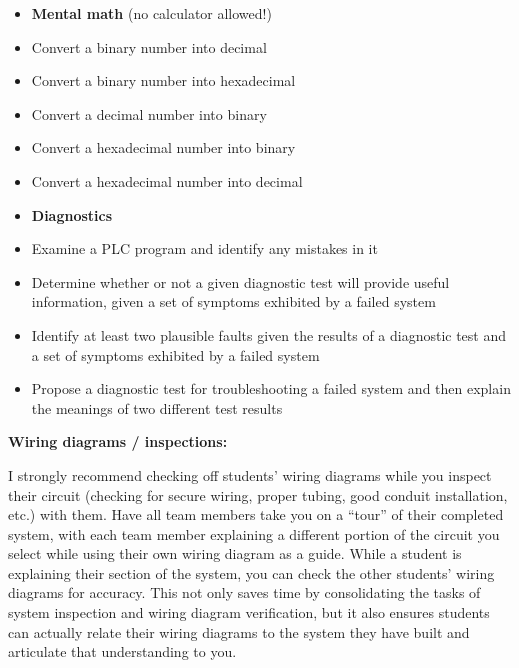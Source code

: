 \filbreak

\begin{itemize}
\item{} {\bf Mental math} (no calculator allowed!)
\item{} Convert a binary number into decimal
\item{} Convert a binary number into hexadecimal
\item{} Convert a decimal number into binary
\item{} Convert a hexadecimal number into binary
\item{} Convert a hexadecimal number into decimal
\end{itemize}

\filbreak

\begin{itemize}
\item{} {\bf Diagnostics}
\item{} Examine a PLC program and identify any mistakes in it
\item{} Determine whether or not a given diagnostic test will provide useful information, given a set of symptoms exhibited by a failed system
\item{} Identify at least two plausible faults given the results of a diagnostic test and a set of symptoms exhibited by a failed system
\item{} Propose a diagnostic test for troubleshooting a failed system and then explain the meanings of two different test results
\end{itemize}















\noindent
{\bf Wiring diagrams / inspections:}

I strongly recommend checking off students' wiring diagrams while you inspect their circuit (checking for secure wiring, proper tubing, good conduit installation, etc.) with them.  Have all team members take you on a ``tour'' of their completed system, with each team member explaining a different portion of the circuit you select while using their own wiring diagram as a guide.  While a student is explaining their section of the system, you can check the other students' wiring diagrams for accuracy.  This not only saves time by consolidating the tasks of system inspection and wiring diagram verification, but it also ensures students can actually relate their wiring diagrams to the system they have built and articulate that understanding to you.

